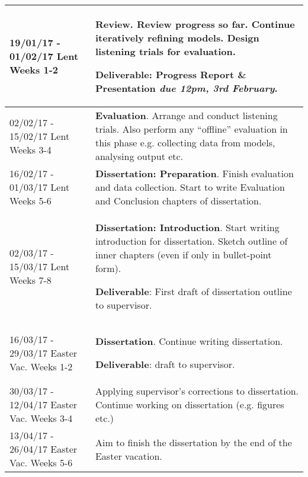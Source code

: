 \documentclass[12pt,a4paper,twoside]{article}
\begin{document}
\begin{longtable}{ p{4cm} | p{11cm} }
19/01/17 - 01/02/17 Lent Weeks 1-2 & \textbf{Review}.
Review progress so far. Continue iteratively refining models. Design listening
trials for evaluation.

\textbf{Deliverable}: Progress Report \& Presentation \emph{due 12pm, 3rd
	February}.
\\ \hline

02/02/17 - 15/02/17 Lent Weeks 3-4 & \textbf{Evaluation}.
Arrange and conduct listening trials. Also perform any ``offline'' evaluation in
this phase e.g. collecting data from models, analysing output etc.
\\ \hline

16/02/17 - 01/03/17 Lent Weeks 5-6 & \textbf{Dissertation: Preparation}.
Finish evaluation and data collection. Start to write Evaluation and Conclusion
chapters of dissertation.
\\ \hline

02/03/17 - 15/03/17 Lent Weeks 7-8 & \textbf{Dissertation: Introduction}.
Start writing introduction for dissertation. Sketch outline of inner chapters
(even if only in bullet-point form).

\textbf{Deliverable}: First draft of dissertation outline to supervisor.
\\ \hline

16/03/17 - 29/03/17 Easter Vac. Weeks 1-2 & \textbf{Dissertation}.
Continue writing dissertation. 

\textbf{Deliverable}: draft to supervisor.
\\ \hline

30/03/17 - 12/04/17 Easter Vac. Weeks 3-4 & 
Applying supervisor's corrections to dissertation. Continue working on
dissertation (e.g. figures etc.)
\\ \hline

13/04/17 - 26/04/17 Easter Vac. Weeks 5-6 & 
Aim to finish the dissertation by the end of the Easter vacation.
\\ \hline
\end{longtable}

\printbibliography
\end{document}

